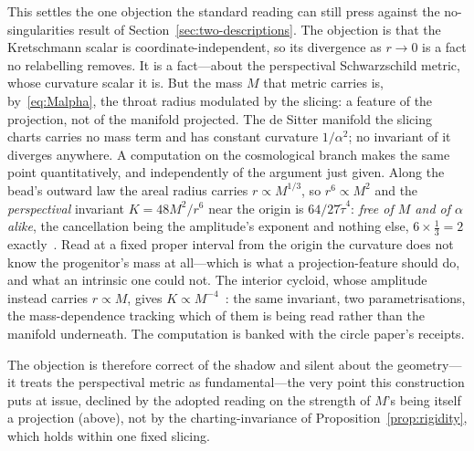 \documentclass[11pt,a4paper]{article}
\theoremstyle{definition}
\begin{document}
This settles the one objection the standard reading can still press against the no-singularities result of Section~\ref{sec:two-descriptions}. The objection is that the Kretschmann scalar is coordinate-independent, so its divergence as $r\to0$ is a fact no relabelling removes. It is a fact---about the perspectival Schwarzschild metric, whose curvature scalar it is. But the mass $M$ that metric carries is, by~\eqref{eq:Malpha}, the throat radius modulated by the slicing: a feature of the projection, not of the manifold projected. The de Sitter manifold the slicing charts carries no mass term and has constant curvature $1/\alpha^{2}$; no invariant of it diverges anywhere. A computation on the cosmological branch makes the same point quantitatively, and independently of the
argument just given. Along the bead's outward law the areal radius carries $r\propto M^{1/3}$, so $r^{6}\propto M^{2}$ and the \emph{perspectival} invariant $K=48M^{2}/r^{6}$ near the origin is $64/27\tilde\tau^{4}$: \emph{free of
$M$ and of $\alpha$ alike}, the cancellation being the amplitude's exponent and nothing else,
$6\times\tfrac13=2$ exactly~\cite{JanzenCRframework}. Read at a fixed proper interval from the origin the
curvature does not know the progenitor's mass at all---which is what a projection-feature should do, and what
an intrinsic one could not. The interior cycloid, whose amplitude instead carries $r\propto M$, gives
$K\propto M^{-4}$~\cite{JanzenCircle}: the same invariant, two parametrisations, the mass-dependence tracking
which of them is being read rather than the manifold underneath. The computation is banked with the circle paper's receipts.

The objection is therefore correct of the shadow and silent about the geometry---it treats the perspectival metric as fundamental---the very point this construction puts at issue, declined by the adopted reading on the strength of $M$'s being itself a projection (above), not by the charting-invariance of Proposition~\ref{prop:rigidity}, which holds within one fixed slicing.
\end{document}
